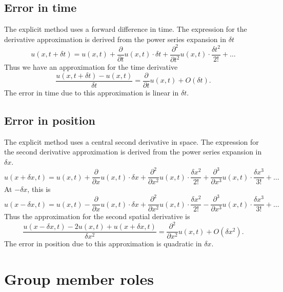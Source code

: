 \documentclass[letterpaper,titlepage,oneside]{report}
\begin{document}
\section*{Error in time}
The explicit method uses a forward difference in time. The
expression for the derivative approximation is derived from
the power series expansion in $\delta t$
\begin{equation}\label{eq:explicitexpansiondt}
  u(x,t+\delta t) = u(x,t) + \frac{\partial}{\partial t}u(x,t)\cdot\delta t
  + \frac{\partial^2}{\partial t^2}u(x,t)\cdot\frac{\delta t^2}{2!} + \dots
\end{equation}
Thus we have an approximation for the time derivative
\begin{equation}\label{eq:expliciterrdt}
  \frac{u(x,t+\delta t)-u(x,t)}{\delta t} = \frac{\partial}{\partial t}u(x,t)
  + O(\delta t).
\end{equation}
The error in time due to this approximation is linear in $\delta t$.

\section*{Error in position}
The explicit method uses a central second derivative in space. The
expression for the second derivative approximation is derived from
the power series expansion in $\delta x$.
\begin{equation}\label{eq:explicitexpansiondx}
  u(x+\delta x,t) = u(x,t) + \frac{\partial}{\partial x}u(x,t)\cdot\delta x +
  \frac{\partial^2}{\partial x^2}u(x,t)\cdot\frac{\delta x^2}{2!} +
  \frac{\partial^3}{\partial x^3}u(x,t)\cdot\frac{\delta x^3}{3!}
  + \dots
\end{equation}
At $-\delta x$, this is
\begin{equation*}
  u(x-\delta x,t) = u(x,t) - \frac{\partial}{\partial x}u(x,t)\cdot\delta x +
  \frac{\partial^2}{\partial x^2}u(x,t)\cdot\frac{\delta x^2}{2!} -
  \frac{\partial^3}{\partial x^3}u(x,t)\cdot\frac{\delta x^3}{3!}
  + \dots
\end{equation*}
Thus the approximation for the second spatial derivative is
\begin{equation}\label{eq:expliciterrdx}
  \frac{u(x-\delta x,t)-2u(x,t)+u(x+\delta x,t)}{\delta x^2} =
  \frac{\partial^2}{\partial x^2}u(x,t) + O(\delta x^2).
\end{equation}
The error in position due to this approximation is quadratic in $\delta x$.

\chapter{Group member roles}
\end{document}
